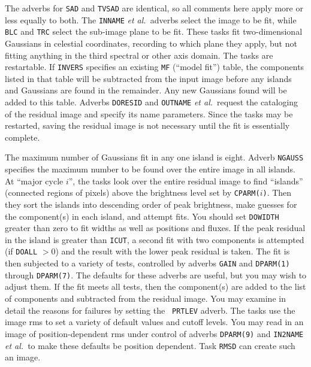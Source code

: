 \documentclass[twoside]{article}
\begin{document}
The adverbs for {\tt SAD} and {\tt TVSAD} are identical, so all
comments here apply more or less equally to both.  The {\tt INNAME}
{\it et al.}~adverbs select the image to be fit, while {\tt BLC} and
{\tt TRC} select the sub-image plane to be fit.  These tasks fit
two-dimensional Gaussians in celestial coordinates, recording to which
plane they apply, but not fitting anything in the third spectral or
other axis domain.  The tasks are restartable.  If {\tt INVERS}
specifies an existing {\tt MF} (``model fit'') table, the components
listed in that table will be subtracted from the input image before
any islands and Gaussians are found in the remainder.  Any new
Gaussians found will be added to this table.  Adverbs {\tt DORESID}
and {\tt OUTNAME} {\it et al.}~request the cataloging of the residual
image and specify its name parameters.  Since the tasks may be
restarted, saving the residual image is not necessary until the fit is
essentially complete.

The maximum number of Gaussians fit in any one island is eight.
Adverb {\tt NGAUSS} specifies the maximum number to be found over the
entire image in all islands.  At ``major cycle $i$'', the tasks look
over the entire residual image to find ``islands'' (connected regions
of pixels) above the brightness level set by {\tt CPARM($i$)}\@.  Then
they sort the islands into descending order of peak brightness, make
guesses for the component(s) in each island, and attempt fits.  You
should set {\tt DOWIDTH} greater than zero to fit widths as well as
positions and fluxes.  If the peak residual in the island is greater
than {\tt ICUT}, a second fit with two components is attempted (if
{\tt DOALL} $>0$) and the result with the lower peak residual is
taken.  The fit is then subjected to a variety of tests, controlled by
adverbs {\tt GAIN} and {\tt DPARM(1)} through {\tt DPARM(7)}\@.  The
defaults for these adverbs are useful, but you may wish to adjust
them.  If the fit meets all tests, then the component(s) are added to
the list of components and subtracted from the residual image.  You
may examine in detail the reasons for failures by setting the {\tt
  PRTLEV} adverb.  The tasks use the image rms to set a variety of
default values and cutoff levels.  You may read in an image of
position-dependent rms under control of adverbs {\tt DPARM(9)} and
{\tt IN2NAME} {\it et al.}~to make these defaults be position
dependent.  Task {\tt RMSD} can create such an image.
\end{document}
